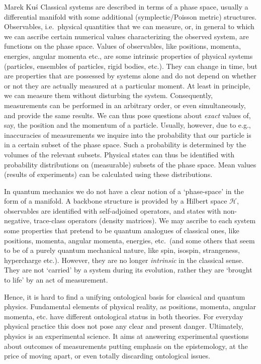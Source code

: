 \begin{artengenv}{Marek Ku\'s}
Classical systems are described in terms of a phase space, usually a differential manifold with some additional (symplectic/Poisson metric) structures. Observables, i.e.\ physical quantities that we can measure, or, in general to which we can ascribe certain numerical values characterizing the observed system, are functions on the phase space.
Values of observables, like positions, momenta, energies, angular momenta etc., are some intrinsic properties of physical systems (particles, ensembles of particles, rigid bodies, etc.). They can change in time, but are properties that are possessed by systems alone and do not depend on whether or not they are actually measured at a particular moment. At least in principle, we can measure them without disturbing the system. Consequently, measurements can be performed in an arbitrary order, or even simultaneously, and provide the same results. We can thus pose questions about \textit{exact} values of, say, the position and the momentum of a particle. Usually, however, due to e.g., inaccuracies of measurements we inquire into the probability  that our particle is in a certain subset of the phase space. Such a probability is determined by the volumes of the relevant subsets. Physical states can thus be identified with probability distributions on (measurable) subsets of the phase space. Mean values (results of experiments) can be calculated using these distributions.


In quantum mechanics we do not have a clear notion of a `phase-space' in the form of a manifold. A backbone structure is provided by a Hilbert space $ \mathcal{H} $, observables are identified with self-adjoined operators, and states with non-negative, trace-class operators (density matrices). We may ascribe to each system some properties that pretend to be quantum analogues of classical ones, like positions, momenta, angular momenta, energies, etc.\ (and some others that seem to be of a purely quantum mechanical nature, like spin, isospin, strangeness, hypercharge etc.). However, they are no longer \textit{intrinsic} in the classical sense. They are not `carried' by a system during its evolution, rather they are `brought to life' by an act of measurement.
         
         
Hence, it is hard to find a unifying ontological basis for classical and quantum physics. Fundamental elements of physical reality, as positions, momenta, angular momenta, etc. have different ontological status in both theories. For everyday physical practice this does not pose any clear and present danger. Ultimately, physics is an experimental science. It aims at answering experimental questions about outcomes of measurements putting emphasis on the epistemology, at the price of moving apart, or even totally discarding ontological issues.  
         

\end{artengenv}
